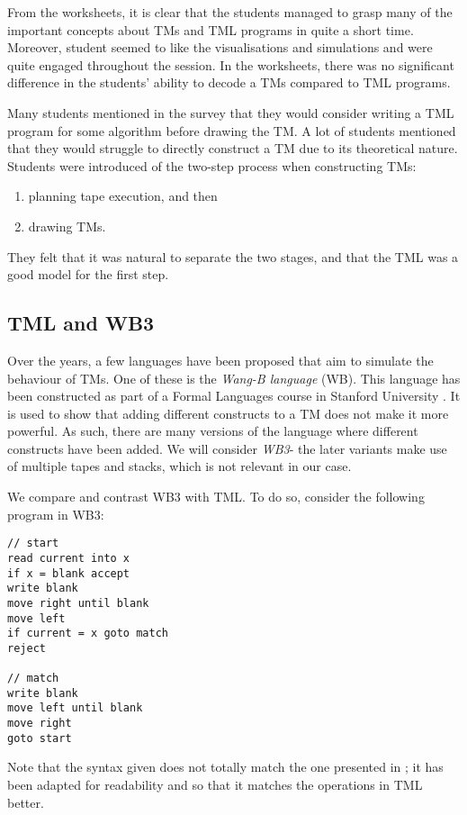 From the worksheets, it is clear that the students managed to grasp many of the important concepts about TMs and TML programs in quite a short time. Moreover, student seemed to like the visualisations and simulations and were quite engaged throughout the session. In the worksheets, there was no significant difference in the students' ability to decode a TMs compared to TML programs.

Many students mentioned in the survey that they would consider writing a TML program for some algorithm before drawing the TM. A lot of students mentioned that they would struggle to directly construct a TM due to its theoretical nature. Students were introduced of the two-step process when constructing TMs:
\begin{enumerate}
    \item planning tape execution, and then
    \item drawing TMs.
\end{enumerate}
They felt that it was natural to separate the two stages, and that the TML was a good model for the first step.

\subsection{TML and WB3}
Over the years, a few languages have been proposed that aim to simulate the behaviour of TMs. One of these is the \emph{Wang-B language} (WB). This language has been constructed as part of a Formal Languages course in Stanford University \citep{stanford_WB}. It is used to show that adding different constructs to a TM does not make it more powerful. As such, there are many versions of the language where different constructs have been added. We will consider \emph{WB3}- the later variants make use of multiple tapes and stacks, which is not relevant in our case.

We compare and contrast WB3 with TML. To do so, consider the following program in WB3:
\begin{lstlisting}[language=WB]
// start
read current into x
if x = blank accept
write blank
move right until blank
move left
if current = x goto match
reject

// match
write blank
move left until blank
move right
goto start
\end{lstlisting}
Note that the syntax given does not totally match the one presented in \citet{stanford_WB}; it has been adapted for readability and so that it matches the operations in TML better.

